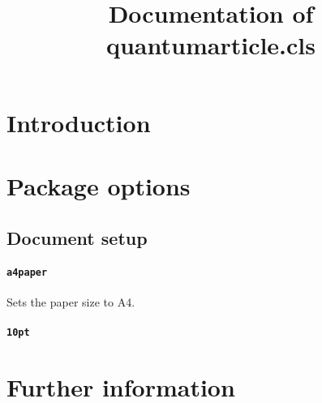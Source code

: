 \documentclass[a4paper,noarxiv,onecolumn,11pt]{quantumarticle}
\newcommand{\DescribeOption}[2]{
	\paragraph{\texttt{#1}} #2
}
\begin{document}
	\title{Documentation of quantumarticle.cls}
	\maketitle
	
	\tableofcontents
	
	\section{Introduction}
	
	\section{Package options}
	
	\subsection{Document setup}
	
	\DescribeOption{a4paper}{
		Sets the paper size to A4.
	}
	\DescribeOption{10pt}{\lipsum[1]}
	
	\section{Further information}
\end{document}
